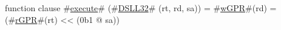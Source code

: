 function clause #\hyperref[zexecute]{execute}# (#\hyperref[zDSLLthreetwo]{DSLL32}# (rt, rd, sa)) =
  {
    #\hyperref[zwGPR]{wGPR}#(rd) = (#\hyperref[zrGPR]{rGPR}#(rt) << (0b1 @ sa))
  }
